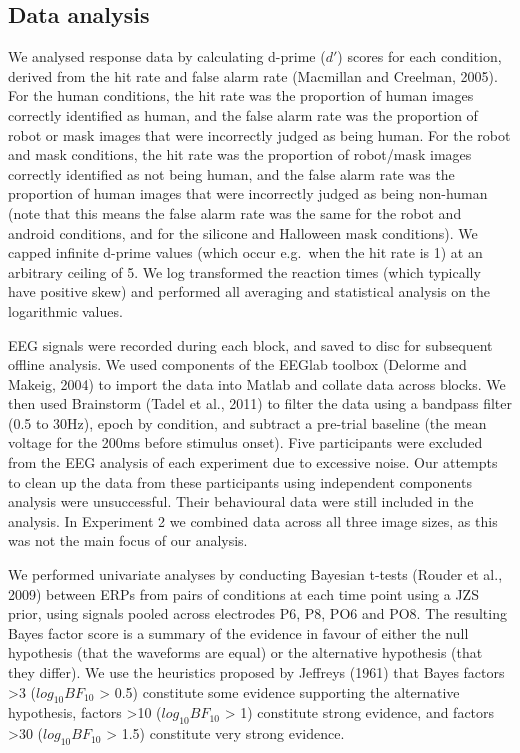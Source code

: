 \documentclass[
]{article}
\begin{document}
\hypertarget{data-analysis}{%
\subsection{Data analysis}\label{data-analysis}}

We analysed response data by calculating d-prime (\(d'\)) scores for each condition, derived from the hit rate and false alarm rate (Macmillan and Creelman, 2005). For the human conditions, the hit rate was the proportion of human images correctly identified as human, and the false alarm rate was the proportion of robot or mask images that were incorrectly judged as being human. For the robot and mask conditions, the hit rate was the proportion of robot/mask images correctly identified as not being human, and the false alarm rate was the proportion of human images that were incorrectly judged as being non-human (note that this means the false alarm rate was the same for the robot and android conditions, and for the silicone and Halloween mask conditions). We capped infinite d-prime values (which occur e.g.~when the hit rate is 1) at an arbitrary ceiling of 5. We log transformed the reaction times (which typically have positive skew) and performed all averaging and statistical analysis on the logarithmic values.

EEG signals were recorded during each block, and saved to disc for subsequent offline analysis. We used components of the EEGlab toolbox (Delorme and Makeig, 2004) to import the data into Matlab and collate data across blocks. We then used Brainstorm (Tadel et al., 2011) to filter the data using a bandpass filter (0.5 to 30Hz), epoch by condition, and subtract a pre-trial baseline (the mean voltage for the 200ms before stimulus onset). Five participants were excluded from the EEG analysis of each experiment due to excessive noise. Our attempts to clean up the data from these participants using independent components analysis were unsuccessful. Their behavioural data were still included in the analysis. In Experiment 2 we combined data across all three image sizes, as this was not the main focus of our analysis.

We performed univariate analyses by conducting Bayesian t-tests (Rouder et al., 2009) between ERPs from pairs of conditions at each time point using a JZS prior, using signals pooled across electrodes P6, P8, PO6 and PO8. The resulting Bayes factor score is a summary of the evidence in favour of either the null hypothesis (that the waveforms are equal) or the alternative hypothesis (that they differ). We use the heuristics proposed by Jeffreys (1961) that Bayes factors \textgreater3 (\(log_{10}BF_{10}\) \textgreater{} 0.5) constitute some evidence supporting the alternative hypothesis, factors \textgreater10 (\(log_{10}BF_{10}\) \textgreater{} 1) constitute strong evidence, and factors \textgreater30 (\(log_{10}BF_{10}\) \textgreater{} 1.5) constitute very strong evidence.
\end{document}
